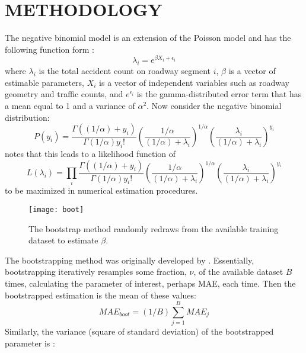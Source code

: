 \documentclass[titlepage,12pt,times,nopageno]{article}
\begin{document}
\section*{\label{sec:method}\normalsize METHODOLOGY}
The negative binomial model is an extension of the Poisson model and has the following function form \citep{washington2003sae}:
\begin{equation}
\lambda_i=e^{\beta X_i+\epsilon_i} \label{eqn:nb}
\end{equation}
where $\lambda_i$ is the total accident count on roadway segment $i$, $\beta$ is a vector of estimable parameters, $X_i$ is a vector of independent variables such as roadway geometry and traffic counts, and $e^{\epsilon_i}$ is the gamma-distributed error term that has a mean equal to 1 and a variance of $\alpha^2$.  Now consider the negative binomial distribution:
\begin{equation}
P(y_i)=\frac{\Gamma((1/\alpha)+y_i)}{\Gamma(1/\alpha)y_i!}\left(\frac{1/\alpha}{(1/\alpha)+\lambda_i}\right)^{1/\alpha}\left(\frac{\lambda_i}{(1/\alpha)+\lambda_i}\right)^{y_i} \label{eqn:prob}
\end{equation}
\citet{washington2003sae} notes that this leads to a likelihood function of
\begin{equation}
L(\lambda_i)=\prod_i\frac{\Gamma((1/\alpha)+y_i)}{\Gamma(1/\alpha)y_i!}\left(\frac{1/\alpha}{(1/\alpha)+\lambda_i}\right)^{1/\alpha}\left(\frac{\lambda_i}{(1/\alpha)+\lambda_i}\right)^{y_i} \label{eqn:like}
\end{equation}
to be maximized in numerical estimation procedures.\par
\begin{figure}[h]
\centering
  \captionnamefont{\bfseries}
  \captiontitlefont{\normalsize \bfseries}
  \captiondelim{ }
  \renewcommand{\figurename}{FIGURE}
\texttt{[image: boot]}
	\caption{The bootstrap method randomly redraws from the available training dataset to estimate $\beta$.}
	\label{fig:boot}
\end{figure}
The bootstrapping method was originally developed by \citet{efron1979bma}.  Essentially, bootstrapping iteratively resamples some fraction, $\nu$, of the available dataset $B$ times, calculating the parameter of interest, perhaps MAE, each time.  Then the bootstrapped estimation is the mean of these values:
\begin{equation}
MAE_{boot}=(1/B)\sum_{j=1}^B MAE_j \label{eqn:bootmae}
\end{equation}
Similarly, the variance (square of standard deviation) of the bootstrapped parameter is \citep{hastie2001esl}:
\end{document}

